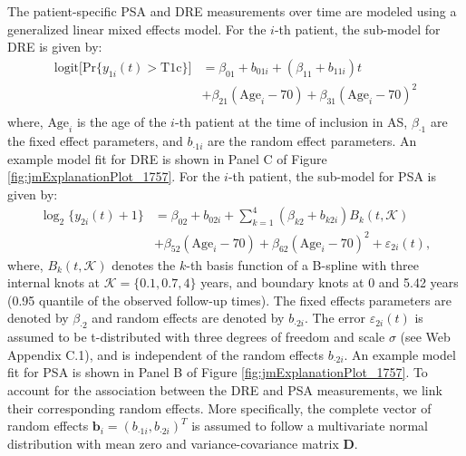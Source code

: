 The patient-specific PSA and DRE measurements over time are modeled using a generalized linear mixed effects model. For the $i$-th patient, the sub-model for DRE is given by:
\begin{equation}
\label{eq:long_model_dre}
\begin{aligned}
    \mbox{logit} \big[\mbox{Pr}\{y_{1i}(t) > \mbox{T1c}\}\big] &= \beta_{01} + b_{01i} + (\beta_{11} + b_{11i}) t\\
    &+ \beta_{21} (\mbox{Age}_i-70) + \beta_{31} (\mbox{Age}_i-70)^2\\ 
    \end{aligned}
\end{equation}
where, $\mbox{Age}_i$ is the age of the $i$-th patient at the time of inclusion in AS, $\beta_{\cdot1}$ are the fixed effect parameters, and $b_{\cdot1i}$ are the random effect parameters. An example model fit for DRE is shown in Panel C of Figure \ref{fig:jmExplanationPlot_1757}. For the $i$-th patient, the sub-model for PSA is given by:
\begin{equation}
\label{eq:long_model_psa}
\begin{aligned}
    \log_2 \big\{y_{2i}(t) + 1\big\} &= \beta_{02} + b_{02i} + \sum_{k=1}^4 (\beta_{k2} + b_{k2i})  B_k(t,\mathcal{K})\\ 
    &+ \beta_{52} (\mbox{Age}_i-70) + \beta_{62} (\mbox{Age}_i-70)^2 + \varepsilon_{2i}(t),
    \end{aligned}
\end{equation}
where, $B_k(t, \mathcal{K})$ denotes the $k$-th basis function of a B-spline with three internal knots at $\mathcal{K} = \{0.1, 0.7, 4\}$ years, and boundary knots at 0 and 5.42 years (0.95 quantile of the observed follow-up times). The fixed effects parameters are denoted by $\beta_{\cdot2}$ and random effects are denoted by $b_{\cdot2i}$. The error $\varepsilon_{2i}(t)$ is assumed to be t-distributed with three degrees of freedom and scale $\sigma$ (see Web Appendix C.1), and is independent of the random effects $b_{\cdot2i}$. An example model fit for PSA is shown in Panel B of Figure \ref{fig:jmExplanationPlot_1757}. To account for the association between the DRE and PSA measurements, we link their corresponding random effects. More specifically, the complete vector of random effects $\boldsymbol{b}_i = (b_{\cdot1i}, b_{\cdot2i})^T$ is assumed to follow a multivariate normal distribution with mean zero and variance-covariance matrix $\boldsymbol{D}$.

